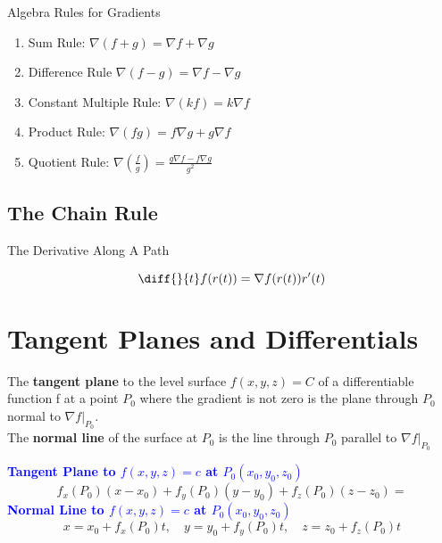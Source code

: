 \documentclass[12pt,a4paper]{article}
\newenvironment{definition}{\begin{definitionbox}}{\end{definitionbox}\vspace{1\baselineskip}}
\newenvironment{ruleBox}[1]{\begin{rulebox}{#1}}{\end{rulebox}\vspace{1\baselineskip}}
\newenvironment{mynote}{\vspace{1\baselineskip}\begin{note}}{\end{note}\vspace{1\baselineskip}}
\begin{document}
\begin{ruleBox}{Algebra Rules for Gradients}

    \begin{enumerate}
        \item Sum Rule: \quad \(\nabla (f + g) = \nabla f + \nabla g\)
        \item Difference Rule \quad \(\nabla (f - g) = \nabla f - \nabla g\)
        \item Constant Multiple Rule: \quad \(\nabla (kf) = k \nabla f\)
        \item Product Rule: \quad \(\nabla(fg) = f \nabla g  + g \nabla f\)
        \item  Quotient Rule: \quad \(\nabla \left( \frac{f}{g}\right) = \frac{g \nabla f - f \nabla g}{g^2}\)
    \end{enumerate}

    
\end{ruleBox}


\subsection{The Chain Rule }

\begin{ruleBox}{The Derivative Along A Path}

    \[\diff{}{t}f(r(t))= \nabla f(r(t)) r'(t)\]
    
\end{ruleBox}


\section{Tangent Planes and Differentials}

\begin{definition}
    The \textbf{tangent plane} to the level surface \(f(x,y,z)=C\) of a differentiable function f at a point \(P_0\) where the gradient is not zero is the plane through \(P_0\) normal to \(\nabla f |_{P_0}\). \\
    The \textbf{normal line} of the surface at \(P_0\) is the line through \(P_0\) parallel to \(\nabla f |_{P_0}\)

\end{definition}


\begin{mynote}
    \textcolor{blue}{\textbf{Tangent Plane to \(f(x,y,z) = c\) at \(P_0(x_0,y_0,z_0)\)}}
    \[f_x(P_0)(x-x_0) + f_y(P_0)(y-y_0) + f_z(P_0)(z-z_0)=\]
    \textcolor{blue}{\textbf{Normal Line to \(f(x,y,z) = c\) at \(P_0(x_0,y_0,z_0)\)}}
    \[x = x_0 + f_x(P_0)t, \quad y = y_0 + f_y(P_0)t, \quad z = z_0 + f_z(P_0)t \]

\end{mynote}
\end{document}

